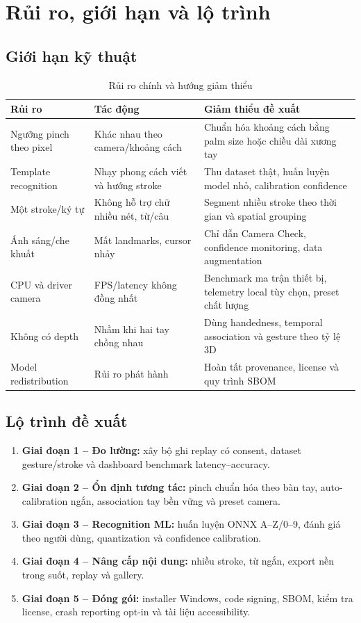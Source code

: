 \documentclass[12pt,a4paper,oneside]{report}
\begin{document}
\chapter{Rủi ro, giới hạn và lộ trình}

\section{Giới hạn kỹ thuật}

\begin{table}[H]
\centering
\caption{Rủi ro chính và hướng giảm thiểu}
\begin{tabularx}{\textwidth}{L{38mm}Y Y}
\toprule
\textbf{Rủi ro} & \textbf{Tác động} & \textbf{Giảm thiểu đề xuất}\\
\midrule
Ngưỡng pinch theo pixel & Khác nhau theo camera/khoảng cách & Chuẩn hóa khoảng cách bằng palm size hoặc chiều dài xương tay\\
Template recognition & Nhạy phong cách viết và hướng stroke & Thu dataset thật, huấn luyện model nhỏ, calibration confidence\\
Một stroke/ký tự & Không hỗ trợ chữ nhiều nét, từ/câu & Segment nhiều stroke theo thời gian và spatial grouping\\
Ánh sáng/che khuất & Mất landmarks, cursor nhảy & Chỉ dẫn Camera Check, confidence monitoring, data augmentation\\
CPU và driver camera & FPS/latency không đồng nhất & Benchmark ma trận thiết bị, telemetry local tùy chọn, preset chất lượng\\
Không có depth & Nhầm khi hai tay chồng nhau & Dùng handedness, temporal association và gesture theo tỷ lệ 3D\\
Model redistribution & Rủi ro phát hành & Hoàn tất provenance, license và quy trình SBOM\\
\bottomrule
\end{tabularx}
\end{table}

\section{Lộ trình đề xuất}

\begin{enumerate}
  \item \textbf{Giai đoạn 1 -- Đo lường:} xây bộ ghi replay có consent, dataset gesture/stroke và dashboard benchmark latency--accuracy.
  \item \textbf{Giai đoạn 2 -- Ổn định tương tác:} pinch chuẩn hóa theo bàn tay, auto-calibration ngắn, association tay bền vững và preset camera.
  \item \textbf{Giai đoạn 3 -- Recognition ML:} huấn luyện ONNX A--Z/0--9, đánh giá theo người dùng, quantization và confidence calibration.
  \item \textbf{Giai đoạn 4 -- Nâng cấp nội dung:} nhiều stroke, từ ngắn, export nền trong suốt, replay và gallery.
  \item \textbf{Giai đoạn 5 -- Đóng gói:} installer Windows, code signing, SBOM, kiểm tra license, crash reporting opt-in và tài liệu accessibility.
\end{enumerate}
\end{document}
